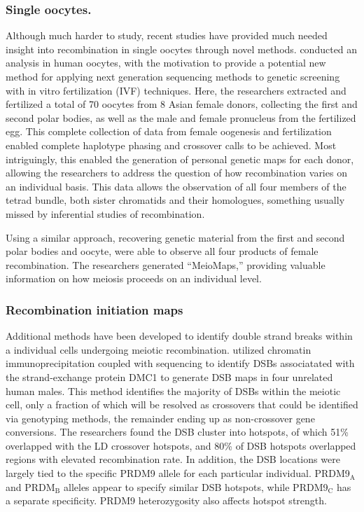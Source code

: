 \subsubsection{Single oocytes.}
Although much harder to study, recent studies have provided much needed insight into recombination in single oocytes through novel methods.
\citet{Hou2013} conducted an analysis in human oocytes, with the motivation to provide a potential new method for applying next generation sequencing methods to genetic screening with in vitro fertilization (IVF) techniques.
Here, the researchers extracted and fertilized a total of 70 oocytes from 8 Asian female donors, collecting the first and second polar bodies, as well as the male and female pronucleus from the fertilized egg.
This complete collection of data from female oogenesis and fertilization enabled complete haplotype phasing and crossover calls to be achieved.
Most intriguingly, this enabled the generation of personal genetic maps for each donor, allowing the researchers to address the question of how recombination varies on an individual basis.
This data allows the observation of all four members of the tetrad bundle, both sister chromatids and their homologues, something usually missed by inferential studies of recombination.


Using a similar approach, recovering genetic material from the first and second polar bodies and oocyte, \citet{Ottolini2015} were able to observe all four products of female recombination.
The researchers generated ``MeioMaps,'' providing valuable information on how meiosis proceeds on an individual level.



\subsubsection{Recombination initiation maps}
Additional methods have been developed to identify double strand breaks within a individual cells undergoing meiotic recombination.
\citet{Pratto2014} utilized chromatin immunoprecipitation coupled with sequencing to identify DSBs associatated with the strand-exchange protein DMC1 to generate DSB maps in four unrelated human males.
This method identifies the majority of DSBs within the meiotic cell, only a fraction of which will be resolved as crossovers that could be identified via genotyping methods, the remainder ending up as non-crossover gene conversions.
The researchers found the DSB cluster into hotspots, of which 51\% overlapped with the LD crossover hotspots\cite{hapmap2007}, and 80\% of DSB hotspots overlapped regions with elevated recombination rate.
In addition, the DSB locations were largely tied to the specific PRDM9 allele for each particular individual.
PRDM9$_\text{A}$ and PRDM$_\text{B}$ alleles appear to specify similar DSB hotspots, while PRDM9$_\text{C}$ has a separate specificity.
PRDM9 heterozygosity also affects hotspot strength.


